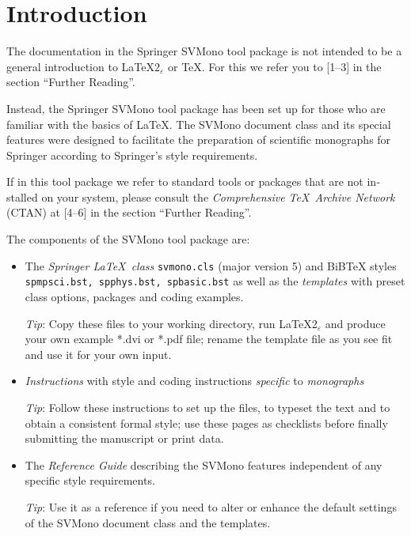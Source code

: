 \documentclass[graybox]{svmono}
\begin{document}
\def\thesection{\arabic{section}}
\section{Introduction}\label{sec:1}
The documentation in the Springer {\sc SVMono} tool package is not intended to be a general introduction to \LaTeX$2_\varepsilon$ or \TeX. For this we refer you to [1--3] in the section ``Further Reading''.

\pagebreak

Instead, the Springer {\sc SVMono} tool package has been set up for those who are familiar with the basics of \LaTeX. The {\sc SVMono} document class and its special features were designed to facilitate the preparation of scientific monographs for Springer according to Springer's style requirements.

If in this tool package we refer to standard tools or packages that are not in­stalled on your system, please consult the {\it Comprehensive \TeX\ Archive Network} (CTAN) at [4--6] in the section ``Further Reading''.

The components of the {\sc SVMono} tool package are:

\begin{itemize}
\item The {\it Springer \LaTeX~class} {\tt svmono.cls} (major version 5) and BiBTeX styles {\tt spmpsci.bst, spphys.bst, spbasic.bst} as well as the {\it templates} with preset class options, packages and coding examples.

{\it Tip}: Copy these files to your working directory, run \LaTeX2$_\varepsilon$ and produce your own example *.dvi or *.pdf file; rename the template file as you see fit and use it for your own input.

\item {\it Instructions} with style and coding instructions {\it specific} to {\it monographs}

{\it Tip}: Follow these instructions to set up the files, to typeset the text and to obtain a consistent formal style; use these pages as checklists before finally submitting the manuscript or print data.

\item The {\it Reference Guide} describing the {\sc SVMono} features independent of any specific style requirements.

{\it Tip}: Use it as a reference if you need to alter or enhance the default settings of the {\sc SVMono} document class and the templates.
\end{itemize}
\end{document}
